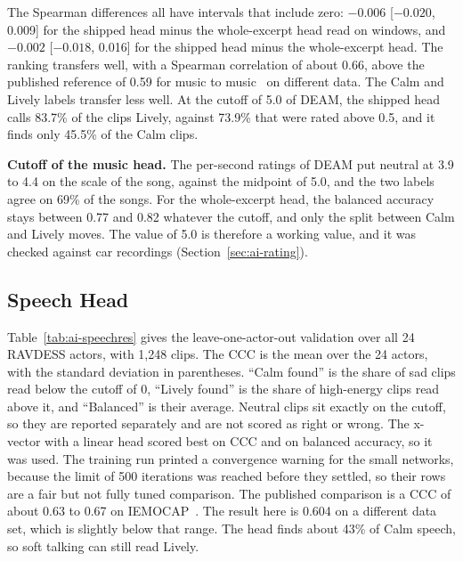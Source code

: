 The Spearman differences all have intervals that include zero: $-0.006$ [$-0.020$, 0.009] for the shipped head minus the whole-excerpt head read on windows, and $-0.002$ [$-0.018$, 0.016] for the shipped head minus the whole-excerpt head. The ranking transfers well, with a Spearman correlation of about 0.66, above the published reference of 0.59 for music to music~\cite{zhang2026generalisation} on different data. The Calm and Lively labels transfer less well. At the cutoff of 5.0 of DEAM, the shipped head calls 83.7\% of the clips Lively, against 73.9\% that were rated above 0.5, and it finds only 45.5\% of the Calm clips.

\textbf{Cutoff of the music head.} The per-second ratings of DEAM put neutral at 3.9 to 4.4 on the scale of the song, against the midpoint of 5.0, and the two labels agree on 69\% of the songs. For the whole-excerpt head, the balanced accuracy stays between 0.77 and 0.82 whatever the cutoff, and only the split between Calm and Lively moves. The value of 5.0 is therefore a working value, and it was checked against car recordings (Section~\ref{sec:ai-rating}).

\subsection{Speech Head}
\label{sec:ai-speech}
Table~\ref{tab:ai-speechres} gives the leave-one-actor-out validation over all 24 RAVDESS actors, with 1,248 clips. The CCC is the mean over the 24 actors, with the standard deviation in parentheses. ``Calm found'' is the share of sad clips read below the cutoff of 0, ``Lively found'' is the share of high-energy clips read above it, and ``Balanced'' is their average. Neutral clips sit exactly on the cutoff, so they are reported separately and are not scored as right or wrong. The x-vector with a linear head scored best on CCC and on balanced accuracy, so it was used. The training run printed a convergence warning for the small networks, because the limit of 500 iterations was reached before they settled, so their rows are a fair but not fully tuned comparison. The published comparison is a CCC of about 0.63 to 0.67 on IEMOCAP~\cite{zhou2023arousal}. The result here is 0.604 on a different data set, which is slightly below that range. The head finds about 43\% of Calm speech, so soft talking can still read Lively.

